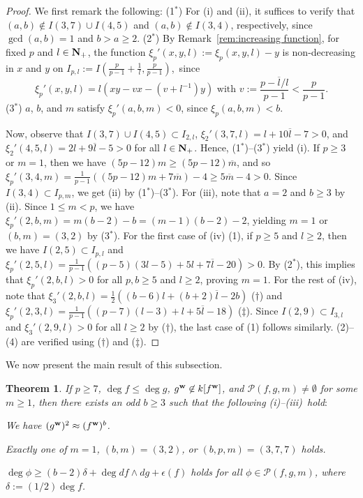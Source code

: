 \documentclass{amsart}
\theoremstyle{plain}
\newtheorem{thm}{Theorem}[section]
\theoremstyle{definition}
\newcommand{\nd}{\noindent}
\newcommand{\ol}{\overline}
\newcommand{\N}{{\bf N}}
\newcommand{\ep}{\epsilon}
\newcommand{\w}{{\bf w}}
\begin{document}
\begin{proof}
We first remark the following: 
(1$^*$) For (i) and (ii), 
it suffices to verify that 
$(a,b)\not\in I(3,7)\cup I(4,5)$ 
and $(a,b)\not\in I(3,4)$, respectively, 
since $\gcd (a,b)=1$ and $b>a\ge 2$. 
(2$^*$) 
By Remark~\ref{rem:increasing function}, 
for fixed $p$ and $l\in \N _+$, 
the function $\xi _p'(x,y,l):=\xi _p(x,y,l)-y$ 
is non-decreasing in $x$ and $y$ on 
$I_{p,l}:=I(\frac{p}{p-1}+\frac{1}{l},\frac{p}{p-1})$,~since 
$$
\xi_p'(x,y,l)
=l(xy-vx-(v+l^{-1})y)
\text{ \ \ with \ \ }
v:=\dfrac{p-\ol{l}/l}{p-1}<
\dfrac{p}{p-1}. 
$$
(3$^*$) 
$a$, $b$, and $m$ satisfy $\xi _p'(a,b,m)<0$, 
since $\xi _p(a,b,m)<b$. 



Now, 
observe that 
$I(3,7)\cup I(4,5)\subset I_{2,l}$, 
$\xi _2'(3,7,l)=l+10\ol{l}-7>0$, 
and $\xi _2'(4,5,l)=2l+9\ol{l}-5>0$ 
for all $l\in \N _+$. 
Hence, 
(1$^*$)--(3$^*$) yield (i). 
If $p\ge 3$ or $m=1$, 
then we have $(5p-12)m\ge (5p-12)\ol{m}$, 
and so $\xi _p'(3,4,m)
=\frac{1}{p-1}((5p-12)m+7\ol{m})-4
\ge 5\ol{m}-4>0$. 
Since $I(3,4)\subset I_{p,m}$, 
we get (ii) by (1$^*$)--(3$^*$). 
For (iii), note that $a=2$ and $b\ge 3$ by (ii). 
Since $1\le m<p$, 
we have $\xi _p'(2,b,m)=m(b-2)-b=(m-1)(b-2)-2$, 
yielding $m=1$ or $(b,m)=(3,2)$ by (3$^*$). 
For the first case of (iv) (1), 
if $p\ge 5$ and $l\ge 2$, 
then we have 
$I(2,5)\subset I_{p,l}$ and 
$\xi _p'(2,5,l)=\frac{1}{p-1}((p-5)(3l-5)+5l+7\ol{l}-20)>0$. 
By (2$^*$), 
this implies that 
$\xi _p'(2,b,l)>0$ for all $p,b\ge 5$ and $l\ge 2$, 
proving $m=1$. 
For the rest of (iv), 
note that 
$\xi _3'(2,b,l)=\frac{1}{2}((b-6)l+(b+2)\ol{l}-2b)$ ($\dag $) 
and  
$\xi _p'(2,3,l)=\frac{1}{p-1}((p-7)(l-3)+l+5\ol{l}-18)$ ($\ddag $). 
Since 
$I(2,9)\subset I_{3,l}$ 
and $\xi _3'(2,9,l)>0$ for all $l\ge 2$ by ($\dag $), 
the last case of (1) follows similarly. 
(2)--(4) are verified using ($\dag $) and ($\ddag $). 
\end{proof}



We now present the main result of this subsection. 



\begin{thm}\label{ex:ineq1}
If $p\ge 7$, 
$\deg f\le \deg g$, $g^{\w }\not\in k[f^{\w }]$, 
and $\mathcal{P}(f,g,m)\ne \emptyset $ for some $m\ge 1$, 
then there exists an odd $b\ge 3$ such that 
the following {\rm (i)}--{\rm (iii)}~hold$:$ 


\nd{\rm (i)} 
We have $(g^{\w })^2\approx (f^{\w })^b$. 



\nd{\rm (ii)} 
Exactly one of $m=1$, $(b,m)=(3,2)$, or $(b,p,m)=(3,7,7)$ holds. 



\nd{\rm (iii)} 
$\deg \phi \ge (b-2)\delta +\deg df\wedge dg +\ep (f)$ 
holds for all $\phi \in \mathcal{P}(f,g,m)$, 
where $\delta :=(1/2)\deg f$. 
\end{thm}
\end{document}
